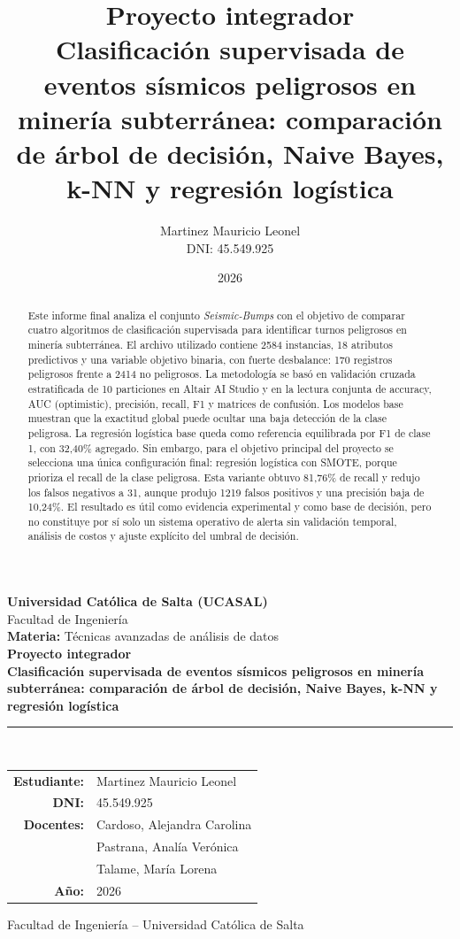 \documentclass[12pt,a4paper]{article}
\title{Proyecto integrador\\[0.75em]Clasificación supervisada de eventos sísmicos peligrosos en minería subterránea: comparación de árbol de decisión, Naive Bayes, k-NN y regresión logística}
\author{Martinez Mauricio Leonel\\DNI: 45.549.925}
\date{2026}
\begin{document}
\begin{titlepage}
\thispagestyle{empty}
\begin{center}
{\Large\textbf{Universidad Católica de Salta (UCASAL)}}\\[0.4cm]
{\large Facultad de Ingeniería}\\[1.2cm]
{\large\textbf{Materia:} Técnicas avanzadas de análisis de datos}\\[2.2cm]

{\LARGE\bfseries Proyecto integrador}\\[0.7cm]
{\Large\bfseries Clasificación supervisada de eventos sísmicos peligrosos en minería subterránea: comparación de árbol de decisión, Naive Bayes, k-NN y regresión logística}\\[1.2cm]

\rule{0.82\textwidth}{0.4pt}\\[1.2cm]

\begin{tabular}{>{\bfseries}rl}
Estudiante: & Martinez Mauricio Leonel \\
DNI: & 45.549.925 \\[0.35cm]
Docentes: & Cardoso, Alejandra Carolina \\
& Pastrana, Analía Verónica \\
& Talame, María Lorena \\[0.35cm]
Año: & 2026 \\
\end{tabular}

\vfill
{\large Facultad de Ingeniería -- Universidad Católica de Salta}
\end{center}
\end{titlepage}

\begin{abstract}
Este informe final analiza el conjunto \textit{Seismic-Bumps} con el objetivo de comparar cuatro algoritmos de clasificación supervisada para identificar turnos peligrosos en minería subterránea. El archivo utilizado contiene 2584 instancias, 18 atributos predictivos y una variable objetivo binaria, con fuerte desbalance: 170 registros peligrosos frente a 2414 no peligrosos. La metodología se basó en validación cruzada estratificada de 10 particiones en Altair AI Studio y en la lectura conjunta de accuracy, AUC (optimistic), precisión, recall, F1 y matrices de confusión. Los modelos base muestran que la exactitud global puede ocultar una baja detección de la clase peligrosa. La regresión logística base queda como referencia equilibrada por F1 de clase 1, con 32,40\% agregado. Sin embargo, para el objetivo principal del proyecto se selecciona una única configuración final: regresión logística con SMOTE, porque prioriza el recall de la clase peligrosa. Esta variante obtuvo 81,76\% de recall y redujo los falsos negativos a 31, aunque produjo 1219 falsos positivos y una precisión baja de 10,24\%. El resultado es útil como evidencia experimental y como base de decisión, pero no constituye por sí solo un sistema operativo de alerta sin validación temporal, análisis de costos y ajuste explícito del umbral de decisión.
\end{abstract}
\end{document}
